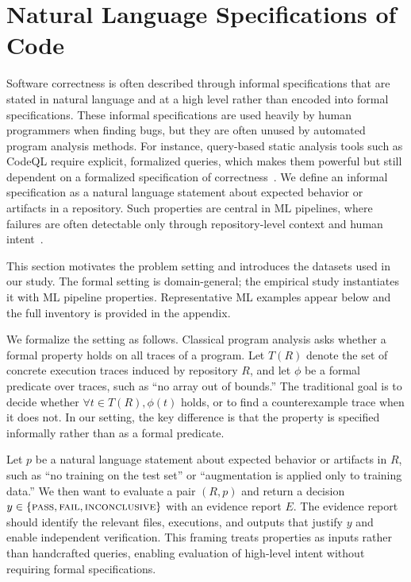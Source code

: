 \documentclass[11pt]{article}
\begin{document}
\section{Natural Language Specifications of Code}

Software correctness is often described through informal specifications that are stated in natural language and at a high level rather than encoded into formal specifications.
These informal specifications are used heavily by human programmers when finding bugs, but they are often unused by automated program analysis methods.
For instance, query-based static analysis tools such as CodeQL require explicit, formalized queries, which makes them powerful but still dependent on a formalized specification of correctness~\citep{codeql}.
We define an informal specification as a natural language statement about expected behavior or artifacts in a repository.
Such properties are central in ML pipelines, where failures are often detectable only through repository-level context and human intent~\citep{schoop2021umlaut}.

This section motivates the problem setting and introduces the datasets used in our study.
The formal setting is domain-general; the empirical study instantiates it with ML pipeline properties.
Representative ML examples appear below and the full inventory is provided in the appendix.

We formalize the setting as follows.
Classical program analysis asks whether a formal property holds on all traces of a program.
Let $T(R)$ denote the set of concrete execution traces induced by repository $R$, and let $\phi$ be a formal predicate over traces, such as ``no array out of bounds.''
The traditional goal is to decide whether $\forall t \in T(R), \phi(t)$ holds, or to find a counterexample trace when it does not.
In our setting, the key difference is that the property is specified informally rather than as a formal predicate.

Let $p$ be a natural language statement about expected behavior or artifacts in $R$, such as ``no training on the test set'' or ``augmentation is applied only to training data.''
We then want to evaluate a pair $(R, p)$ and return a decision $y \in \{\textsc{pass}, \textsc{fail}, \textsc{inconclusive}\}$ with an evidence report $E$.
The evidence report should identify the relevant files, executions, and outputs that justify $y$ and enable independent verification.
This framing treats properties as inputs rather than handcrafted queries, enabling evaluation of high-level intent without requiring formal specifications.
\end{document}
